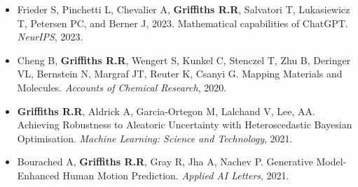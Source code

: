 \documentclass[11pt]{article}
\begin{document}


\begin{itemize}

\item Frieder S, Pinchetti L, Chevalier A, \textbf{Griffiths R.R}, Salvatori T, Lukasiewicz T, Petersen PC, and Berner J, 2023. Mathematical capabilities of ChatGPT. \textit{NeurIPS}, 2023.

\end{itemize}
 


\begin{itemize}

\item Cheng B, \textbf{Griffiths R.R}, Wengert S, Kunkel C, Stenczel T, Zhu B, Deringer VL, Bernstein N, Margraf JT, Reuter K, Csanyi G. Mapping Materials and Molecules. \textit{Accounts of Chemical Research}, 2020. 

\end{itemize}
 


\begin{itemize}

\item \textbf{Griffiths R.R}, Aldrick A, Garcia-Ortegon M, Lalchand V, Lee, AA. Achieving Robustness to Aleatoric Uncertainty with Heteroscedastic Bayesian Optimisation. \textit{Machine Learning: Science and Technology}, 2021.

\end{itemize}
 


\begin{itemize}

\item Bourached A, \textbf{Griffiths R.R}, Gray R, Jha A, Nachev P. Generative Model-Enhanced Human Motion Prediction. \textit{Applied AI Letters}, 2021.

\end{itemize}
 
\end{document}
